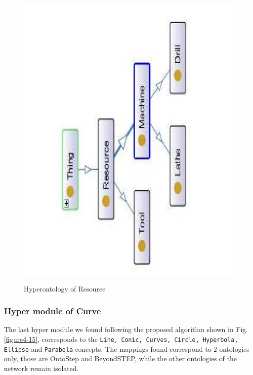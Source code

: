 \begin{figure}
\begin{center}
	\includegraphics[scale=0.5, angle=270]{figure-chapterIV/fig4-25}\\
	\vspace{-40}
	\caption{Hyperontology of Resource}
	\label{figure4-25}
\end{center}
\end{figure}

\subsubsection{Hyper module of Curve}\label{subsubsection4.2.5.5}


The last hyper module we found following the proposed algorithm shown in Fig.\ref{figure4-15}, corresponds to the  \texttt{Line, Conic, Curves, Circle, Hyperbola, Ellipse} and \texttt{Parabola} concepts. The mappings found correspond to 2 ontologies only, those are OntoStep and BeyondSTEP, while the other ontologies of the network remain isolated. 

